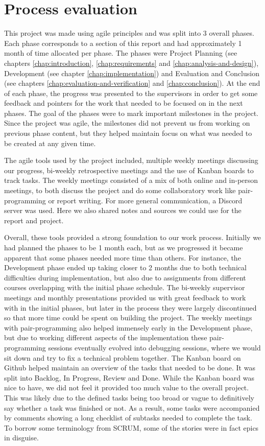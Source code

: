 \section{Process evaluation}
\label{sec:process-evaluation}

This project was made using agile principles and was split into 3 overall phases. Each phase corresponds to a section of
this report and had approximately 1 month of time allocated per phase. The phases were Project Planning 
(see chapters \ref{chap:introduction}, \ref{chap:requirements} and \ref{chap:analysis-and-design}), Development 
(see chapter \ref{chap:implementation}) and Evaluation and Conclusion (see chapters \ref{chap:evaluation-and-verification} 
and \ref{chap:conclusion}). At the end of each phase, the progress was presented to the supervisors in order to get some 
feedback and pointers for the work that needed to be focused on in the next phases. The goal of the phases were to mark 
important milestones in the project. Since the project was agile, the milestones did not prevent us from working on 
previous phase content, but they helped maintain focus on what was needed to be created at any given time.

The agile tools used by the project included, multiple weekly meetings discussing our progress, bi-weekly retrospective 
meetings and the use of Kanban boards to track tasks. The weekly meetings consisted of a mix of both online and in-person
meetings, to both discuss the project and do some collaboratory work like pair-programming or report writing. For more 
general communication, a Discord server was used. Here we also shared notes and sources we could use for the report and 
project.

Overall, these tools provided a strong foundation to our work process. Initially we had planned the phases to be 1 month
each, but as we progressed it became apparent that some phases needed more time than others. For instance, the
Development phase ended up taking closer to 2 months due to both technical difficulties during implementation, but also
due to assignments from different courses overlapping with the initial phase schedule.
The bi-weekly supervisor meetings and monthly presentations provided us with great feedback to work with in the initial
phases, but later in the process they were largely discontinued so that more time could be spent on building the project.
The weekly meetings with pair-programming also helped immensely early in the Development phase, but due to working different
aspects of the implementation these pair-programming sessions eventually evolved into debugging sessions, where we would
sit down and try to fix a technical problem together.
The Kanban board on Github helped maintain an overview of the tasks that needed to be done. It was split into Backlog, In Progress,
Review and Done. While the Kanban board was nice to have, we did not feel it provided too much value to the overall project.
This was likely due to the defined tasks being too broad or vague to definitively say whether a task was finished or not.
As a result, some tasks were accompanied by comments showing a long checklist of subtasks needed to complete the task. 
To borrow some terminology from SCRUM, some of the stories were in fact epics in disguise.
